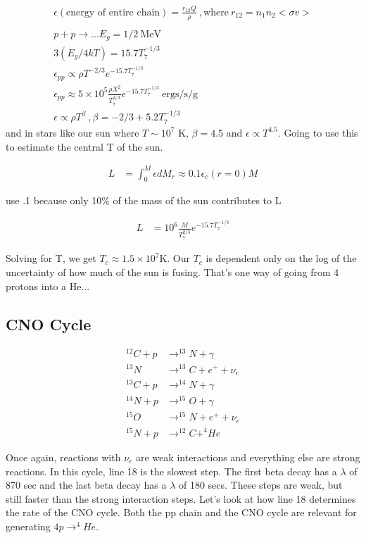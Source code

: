\documentclass[10pt,letterpaper,final]{book}
\begin{document}
\begin{align}
\epsilon (\text{energy of entire chain}) = \frac{r_{12} Q}{ \rho} ~,\text{where}~ r_{12}= n_1n_2<\sigma v>\\
\\
p + p \rightarrow ... E_g = 1/2 ~\text{MeV}\\
3 (E_g/4kT) = 15.7T_7^{-1/3}\\
\epsilon_{pp}  \propto \rho T^{-2/3} e^{-15.7 T_7^{-1/3}}\\
\epsilon_{pp}  \approx 5 \times 10^5 \frac{\rho X^2}{T_7^{2/3}}e^{-15.7 T_7^{-1/3}}~\text{ergs/s/g}\\
\epsilon \propto \rho T^\beta~,\beta = -2/3 + 5.2T_7^{-1/3}
\end{align}
and in stars like our sun where $T \sim 10^7$ K, $\beta = 4.5$ and $\epsilon \propto T^{4.5}$. Going to use this to estimate the central T of the sun. 

\begin{align}
L &= \int_0^M \epsilon dM_r \approx 0.1 \epsilon_c(r=0)M
\end{align}

use .1 because only 10\% of the mass of the sun contributes to L

\begin{align}
L &= 10^6 \frac{M}{T_7^{2/3}}e^{-15.7T_7^{-1/3}}
\end{align}

Solving for T, we get $T_c \approx 1.5 \times 10^7$K. Our $T_c$ is dependent only on the log of the uncertainty of how much of the sun is fusing. That's one way of going from 4 protons into a He...

\subsection{CNO Cycle}

\begin{align}
^{12}C + p & \rightarrow ^{13}N + \gamma \\
^{13} N & \rightarrow ^{13}C + e^+ + \nu_e\\
^{13}C + p  & \rightarrow ^{14}N + \gamma\\
^{14}N + p & \rightarrow ^{15}O + \gamma\\
^{15}O & \rightarrow ^{15}N + e^+ + \nu_e\\
^{15}N + p & \rightarrow ^{12}C + ^4He
\end{align}

Once again, reactions with $\nu_e$ are weak interactions and everything else are strong reactions. In this cycle, line 18 is the slowest step. The first beta decay has a $\lambda$ of 870 sec and the last beta decay has a $\lambda$ of 180 secs. These steps are weak, but still faster than the strong interaction steps. Let's look at how line 18 determines the rate of the CNO cycle. Both the pp chain and the CNO cycle are relevant for generating $ 4p \rightarrow ^4He$. 
\end{document}
